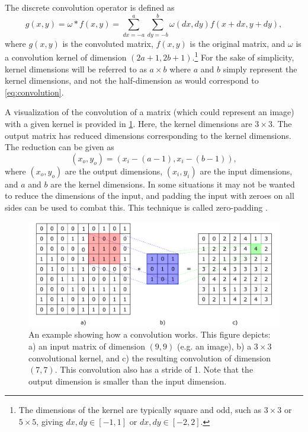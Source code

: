 The discrete convolution operator is defined as 
\begin{equation}
    \label{eq:convolution}
    g(x,y) = \omega \ast f(x,y) = \sum_{dx=-a}^{a}\sum_{dy=-b}^{b} \omega(dx,dy)f(x+dx,y+dy),
\end{equation}
where $g(x,y)$ is the convoluted matrix, $f(x,y)$ is the original matrix, and $\omega$ is a convolution kernel of dimension $(2a+1,2b+1)$.\footnote{The dimensions of the kernel are typically square and odd, such as $3\times3$ or $5\times5$, giving $dx,dy\in[-1,1]$ or $dx,dy\in[-2,2]$. } For the sake of simplicity, kernel dimensions will be referred to as $a\times b$ where $a$ and $b$ simply represent the kernel dimensions, and not the half-dimension as would correspond to \cref{eq:convolution}. 

A visualization of the convolution of a matrix (which could represent an image) with a given kernel is provided in \cref{fig:convolution}. Here, the kernel dimensions are $3\times3$. The output matrix has reduced dimensions corresponding to the kernel dimensions. The reduction can be given as 
\begin{equation}
    \left( x_o,y_o \right) = \left( x_i - \left(a - 1\right), x_i - \left( b - 1 \right) \right),
\end{equation}
where $(x_o,y_o)$ are the output dimensions, $(x_i,y_i)$ are the input dimensions, and $a$ and $b$ are the kernel dimensions. In some situations it may not be wanted to reduce the dimensions of the input, and padding the input with zeroes on all sides can be used to combat this. This technique is called zero-padding \cite{oshea2015introduction}. 
\begin{figure}[htbp]  
    \centering
    \includegraphics[width=.85\textwidth]{figures/convolution.pdf}
    \caption[Convolution example]{An example showing how a convolution works. This figure depicts: a) an input matrix of dimension $(9,9)$ (e.g. an image), b) a $3\times3$ convolutional kernel, and c) the resulting convolution of dimension $(7,7)$. This convolution also has a stride of 1. Note that the output dimension is smaller than the input dimension. }
    \label{fig:convolution}
\end{figure}

